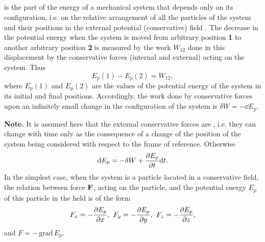 \subsection{}\label{3.3.1}  is the part of the energy of a mechanical system that depends only on its configuration, i.e. on the rela­tive arrangement of all the particles of the system and their positions in the external potential (conservative) field . The decrease in the potential energy when the system is moved from arbitrary position \textbf{1} to another arbitrary position \textbf{2} is measured by the work $W_{12}$ done in this displacement by the conservative forces (internal and external) acting on the system. Thus
\begin{equation*}%
E_{p}(1) - E_{p}(2) = W_{12},
\end{equation*}
where $E_{p}(1)$ and $E_{p}(2)$ are the values of the potential energy of the system in its initial and final positions. Accordingly, the work done by conservative forces upon an infinitely small change in the configuration of the system is $\delta W = - \dd E_{p}$. 

\textbf{Note.} It is assumed here that the external conservative forces are , i.e. they can change with time only as the consequence of a change of the position of the system being considered with respect to the frame of reference. Otherwise
\begin{equation*}%
\dd E_{p}= - \delta W + \pdv{E_{p}}{t} \dd t.
\end{equation*}
In the simplest case, when the system is a particle located in a conservative field, the relation between force $\vb{F}$, acting on the particle, and the potential energy $E_{p}$ of this particle in the held is of the form
\begin{equation*}%
F_{x} = -\pdv{E_{p}}{x}, \,\,F_{y} = -\pdv{E_{p}}{y}, \,\,F_{z} = -\pdv{E_{p}}{z},
\end{equation*}
and $F = - \, \textrm{grad} \, E_{p}$.

